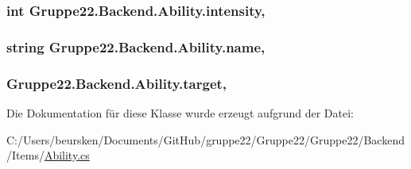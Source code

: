 \hypertarget{class_gruppe22_1_1_backend_1_1_ability_a1d46b2b7c4ef3a68baaecdd760cd1e95}{
\subsubsection[{intensity}]{\setlength{\rightskip}{0pt plus 5cm}int Gruppe22.\-Backend.\-Ability.\-intensity\hspace{0.3cm}{\ttfamily [get]}, {\ttfamily [set]}}}\label{class_gruppe22_1_1_backend_1_1_ability_a1d46b2b7c4ef3a68baaecdd760cd1e95}
\hypertarget{class_gruppe22_1_1_backend_1_1_ability_a64ef394368abef87c79e24d6383f0e41}{
\subsubsection[{name}]{\setlength{\rightskip}{0pt plus 5cm}string Gruppe22.\-Backend.\-Ability.\-name\hspace{0.3cm}{\ttfamily [get]}, {\ttfamily [set]}}}\label{class_gruppe22_1_1_backend_1_1_ability_a64ef394368abef87c79e24d6383f0e41}
\hypertarget{class_gruppe22_1_1_backend_1_1_ability_aa77fd7c42e2d1396cd7930c6afdc4fc0}{
\subsubsection[{target}]{ Gruppe22.\-Backend.\-Ability.\-target\hspace{0.3cm}{\ttfamily [get]}, {\ttfamily [set]}}}\label{class_gruppe22_1_1_backend_1_1_ability_aa77fd7c42e2d1396cd7930c6afdc4fc0}


Die Dokumentation für diese Klasse wurde erzeugt aufgrund der Datei\-:\begin{DoxyCompactItemize}
\item 
C\-:/\-Users/beursken/\-Documents/\-Git\-Hub/gruppe22/\-Gruppe22/\-Gruppe22/\-Backend/\-Items/\hyperlink{_ability_8cs}{Ability.\-cs}\end{DoxyCompactItemize}
